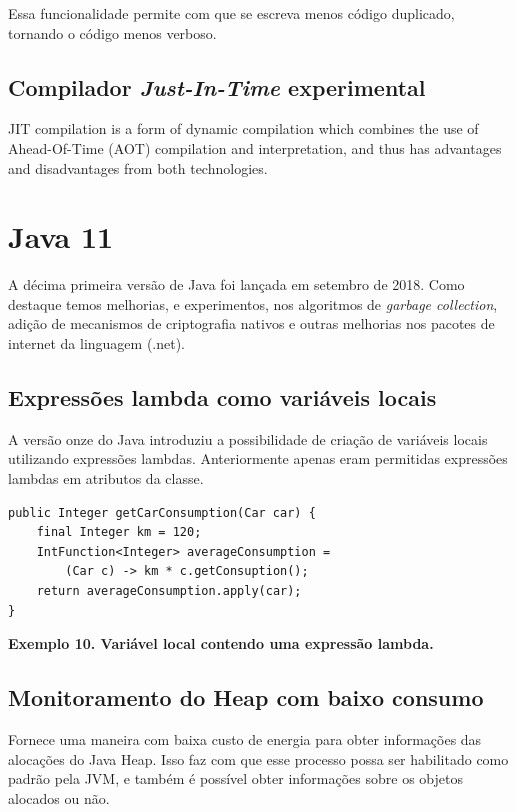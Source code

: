 \documentclass[12pt]{article}
\begin{document}
Essa funcionalidade permite com que se escreva menos código duplicado, tornando o código menos verboso.

\subsection{Compilador \textit{Just-In-Time} experimental}
\cite{javajit} JIT compilation is a form of dynamic compilation which combines the use of Ahead-Of-Time (AOT) compilation and interpretation, and thus has advantages and disadvantages from both technologies.

\section{Java 11}

\cite{javaDocs} A décima primeira versão de Java foi lançada em setembro de 2018. Como destaque temos melhorias, e experimentos, nos algoritmos de \textit{garbage collection}, adição de mecanismos de criptografia nativos e outras melhorias nos pacotes de internet da linguagem (.net).

\subsection{Expressões lambda como variáveis locais}

A versão onze do Java introduziu a possibilidade de criação de variáveis locais utilizando expressões lambdas. Anteriormente apenas eram permitidas expressões lambdas em atributos da classe.

\begin{verbatim}
public Integer getCarConsumption(Car car) {
    final Integer km = 120;
    IntFunction<Integer> averageConsumption = 
        (Car c) -> km * c.getConsuption();
    return averageConsumption.apply(car);
}
\end{verbatim}
\centerline{\textbf{Exemplo 10. Variável local contendo uma expressão lambda.}}
\hfill \break

\subsection{Monitoramento do Heap com baixo consumo}
\cite{javaDocs} Fornece uma maneira com baixa custo de energia para obter informações das alocações do Java Heap. Isso faz com que esse processo possa ser habilitado como padrão pela JVM, e também é possível obter informações sobre os objetos alocados ou não.
\end{document}

